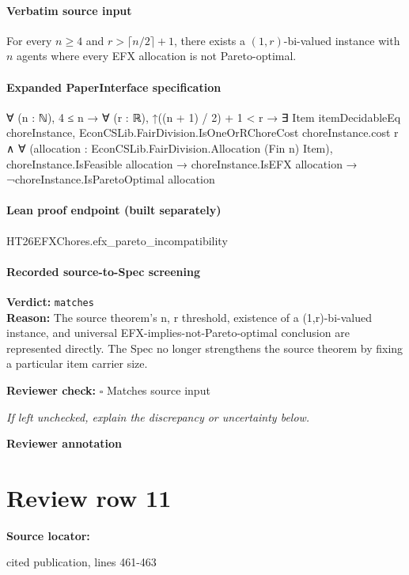\documentclass[10pt]{article}
\newcommand{\reviewerbox}{%
  \par\noindent\fbox{\parbox{0.96\linewidth}{\rule{0pt}{0.38in}}}\par
}
\newcommand{\reviewmatch}[1]{%
  \par\noindent\textbf{Reviewer check:} $\square$\; #1\par
  \noindent\emph{If left unchecked, explain the discrepancy or uncertainty below.}\par
}
\begin{document}
\paragraph{Verbatim source input}
\begin{ReviewVerbatim}
\begin{theorem}\label{thm:EFXPO}
    For every $n\geq 4$ and $r>\lceil n/2\rceil+1$, there exists a $(1,r)$-bi-valued instance with $n$ agents where every EFX allocation is not Pareto-optimal.
\end{theorem}
\end{ReviewVerbatim}


\paragraph{Expanded PaperInterface specification}
\begin{ReviewVerbatim}
∀ (n : ℕ),
  4 ≤ n →
    ∀ (r : ℝ),
      ↑((n + 1) / 2) + 1 < r →
        ∃ Item itemDecidableEq choreInstance,
          EconCSLib.FairDivision.IsOneOrRChoreCost choreInstance.cost r ∧
            ∀ (allocation : EconCSLib.FairDivision.Allocation (Fin n) Item),
              choreInstance.IsFeasible allocation →
                choreInstance.IsEFX allocation → ¬choreInstance.IsParetoOptimal allocation
\end{ReviewVerbatim}

\paragraph{Lean proof endpoint (built separately)}\begin{ReviewVerbatim}
HT26EFXChores.efx_pareto_incompatibility
\end{ReviewVerbatim}

\paragraph{Recorded source-to-Spec screening}
\textbf{Verdict:} \texttt{matches}
\\
\textbf{Reason:} The source theorem's n, r threshold, existence of a (1,r)-bi-valued instance, and universal EFX-implies-not-Pareto-optimal conclusion are represented directly. The Spec no longer strengthens the source theorem by fixing a particular item carrier size.
\reviewmatch{Matches source input}
\noindent\textbf{Reviewer annotation}\par
\reviewerbox
\clearpage
\hypertarget{source-claim-5145ed0daed8afc6}{}
\section*{Review row 11}
\textbf{Source locator:} {\footnotesize\raggedright cited publication, lines 461-\allowbreak{}463\par}
\end{document}
